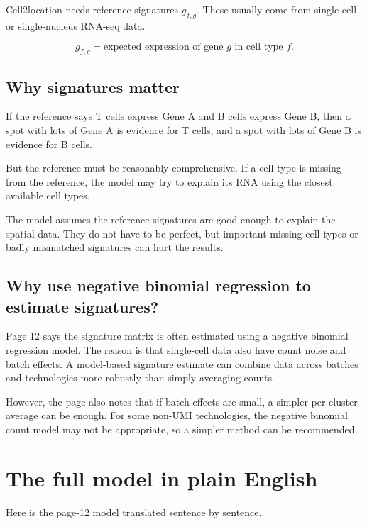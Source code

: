 \documentclass[11pt]{article}
\begin{document}
Cell2location needs reference signatures $g_{f,g}$. These usually come from single-cell or single-nucleus RNA-seq data.

\begin{mathbox}
\[
g_{f,g} = \text{expected expression of gene } g \text{ in cell type } f.
\]
\end{mathbox}

\subsection{Why signatures matter}

If the reference says T cells express Gene A and B cells express Gene B, then a spot with lots of Gene A is evidence for T cells, and a spot with lots of Gene B is evidence for B cells.

But the reference must be reasonably comprehensive. If a cell type is missing from the reference, the model may try to explain its RNA using the closest available cell types.

\begin{assumptionbox}
The model assumes the reference signatures are good enough to explain the spatial data. They do not have to be perfect, but important missing cell types or badly mismatched signatures can hurt the results.
\end{assumptionbox}

\subsection{Why use negative binomial regression to estimate signatures?}

Page 12 says the signature matrix is often estimated using a negative binomial regression model. The reason is that single-cell data also have count noise and batch effects. A model-based signature estimate can combine data across batches and technologies more robustly than simply averaging counts.

However, the page also notes that if batch effects are small, a simpler per-cluster average can be enough. For some non-UMI technologies, the negative binomial count model may not be appropriate, so a simpler method can be recommended.

\section{The full model in plain English}

Here is the page-12 model translated sentence by sentence.
\end{document}
